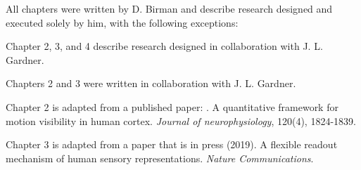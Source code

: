 All chapters were written by D. Birman and describe research designed and executed solely by him, with the following exceptions:

Chapter 2, 3, and 4 describe research designed in collaboration with J. L. Gardner. 

Chapters 2 and 3 were written in collaboration with J. L. Gardner. 

Chapter 2 is adapted from a published paper: \citet{Birman2018-sp}. A quantitative framework for motion visibility in human cortex. \textit{Journal of neurophysiology}, 120(4), 1824-1839.

Chapter 3 is adapted from a paper that is in press \citet{Birman_undated-vk} (2019). A flexible readout mechanism of human sensory representations. \textit{Nature Communications}. 